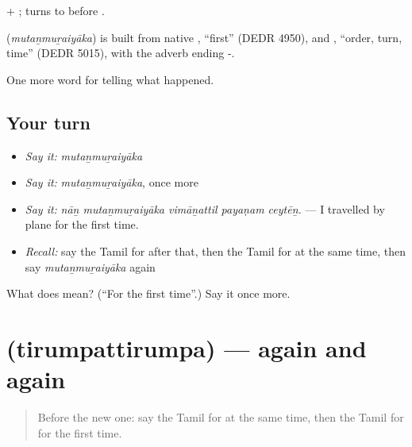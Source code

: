  + ;  turns to  before .

\begin{cousinweb}
\textbf{} (\emph{mutaṉmuṟaiyāka}) is built from native , \textquotedblleft{}first\textquotedblright{} (DEDR 4950), and , \textquotedblleft{}order, turn, time\textquotedblright{} (DEDR 5015), with the adverb ending -.
\end{cousinweb}

\begin{grammarlens}[title={What you've built}]
One more word for telling what happened.
\end{grammarlens}

\subsection*{Your turn}
\begin{itemize}
\raggedright
  \item \emph{Say it:} \emph{mutaṉmuṟaiyāka}
  \item \emph{Say it:} \emph{mutaṉmuṟaiyāka}, once more
  \item \emph{Say it:} \emph{nāṉ mutaṉmuṟaiyāka vimāṉattil payaṇam ceytēṉ.} — I travelled by plane for the first time.
  \item \emph{Recall:} say the Tamil for after that, then the Tamil for at the same time, then say \emph{mutaṉmuṟaiyāka} again
\end{itemize}

\begin{tcolorbox}[breakable,colback=teal!4,colframe=teal!35!black,title={Before you move on}]
What does  mean? (\textquotedblleft{}For the first time\textquotedblright{}.) Say it once more.
\end{tcolorbox}
\section[\texorpdfstring{\ta{திரும்பத்திரும்ப} (tirumpattirumpa)}{திரும்பத்திரும்ப (tirumpattirumpa)}]{ (tirumpattirumpa) — again and again}

\label{lesson:TA-C317-tirumpattirumpa}



\begin{quote}
Before the new one: say the Tamil for at the same time, then the Tamil for for the first time.
\end{quote}

